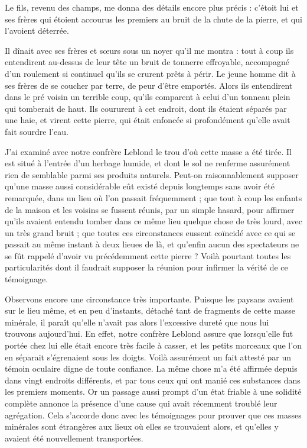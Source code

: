 \documentclass[a4paper, 11pt, oneside, polutonikogreek, french]{article}
\begin{document}
Le fils, revenu des champs, me donna des détails encore plus précis : c'étoit lui et ses frères qui étoient accourus les premiers au bruit de la chute de la pierre, et qui l'avoient déterrée.

Il dînait avec ses frères et sœurs sous un noyer qu'il me montra : tout à coup ils entendirent au-dessus de leur tête un bruit de tonnerre effroyable, accompagné d'un roulement si continuel qu'ils se crurent prêts à périr. Le jeune homme dit à ses frères de se coucher par terre, de peur d'être emportés. Alors ils entendirent dans le pré voisin un terrible coup, qu'ils comparent à celui d'un tonneau plein qui tomberait de haut. Ils coururent à cet endroit, dont ils étaient séparés par une haie, et virent cette pierre, qui était enfoncée si profondément qu'elle avait fait sourdre l'eau.

J'ai examiné avec notre confrère Leblond le trou d'où cette masse a été tirée. Il est situé à l'entrée d'un herbage humide, et dont le sol ne renferme assurément rien de semblable parmi ses produits naturels. Peut-on raisonnablement supposer qu'une masse aussi considérable eût existé depuis longtemps sans avoir été remarquée, dans un lieu où l'on passait fréquemment ; que tout à coup les enfants de la maison et les voisins se fussent réunis, par un simple hasard, pour affirmer qu'ils avaient entendu tomber dans ce même lieu quelque chose de très lourd, avec un très grand bruit ; que toutes ces circonstances eussent coïncidé avec ce qui se passait au même instant à deux lieues de là, et qu'enfin aucun des spectateurs ne se fût rappelé d'avoir vu précédemment cette pierre ? Voilà pourtant toutes les particularités dont il faudrait supposer la réunion pour infirmer la vérité de ce témoignage.

Observons encore une circonstance très importante. Puisque les paysans avaient sur le lieu même, et en peu d'instants, détaché tant de fragments de cette masse minérale, il paraît qu'elle n'avait pas alors l'excessive dureté que nous lui trouvons aujourd'hui. En effet, notre confrère Leblond assure que lorsqu'elle fut portée chez lui elle était encore très facile à casser, et les petits morceaux que l'on en séparait s'égrenaient sous les doigts. Voilà assurément un fait attesté par un témoin oculaire digne de toute confiance. La même chose m'a été affirmée depuis dans vingt endroits différents, et par tous ceux qui ont manié ces substances dans les premiers moments. Or un passage aussi prompt d'un état friable à une solidité complète annonce la présence d'une cause qui avait récemment troublé leur agrégation. Cela s'accorde donc avec les témoignages pour prouver que ces masses minérales sont étrangères aux lieux où elles se trouvaient alors, et qu'elles y avaient été nouvellement transportées.
\end{document}
